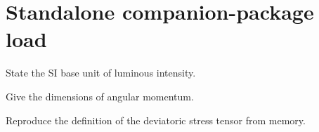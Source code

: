 \documentclass{article}
\begin{document}
\section*{Standalone companion-package load}


\begin{practice}
    \qitem State the SI base unit of luminous intensity. \blank

    \qitem Give the dimensions of angular momentum. \blank
\end{practice}

\begin{drillbox}
    Reproduce the definition of the deviatoric stress tensor from memory.
\end{drillbox}
\end{document}
